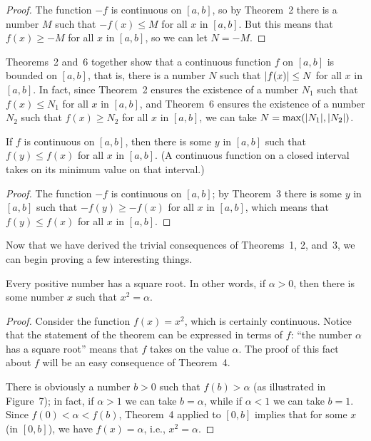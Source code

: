 \begin{proof}
The function $-f$ is continuous on $[a,b]$, so by Theorem~2 there is a number
$M$ such that $-f(x)\leq M$ for all $x$ in $[a,b]$. But this means that
$f(x)\geq -M$ for all $x$ in $[a,b]$, so we can let $N=-M$.
\end{proof}

Theorems~2 and~6 together show that a continuous function $f$ on $[a,b]$ is
bounded on $[a,b]$, that is, there is a number $N$ such that $\lvert f(x)\rvert\leq N$
for all $x$ in $[a,b]$. In fact, since Theorem~2 ensures the existence of a
number $N_1$ such that $f(x)\leq N_1$ for all $x$ in $[a,b]$, and Theorem~6
ensures the existence of a number $N_2$ such that $f(x)\geq N_2$ for all $x$ in
$[a,b]$, we can take $N=\max(\lvert N_1\rvert,\lvert N_2\rvert)$.

\begin{theorem}
If $f$ is continuous on $[a,b]$, then there is some $y$ in $[a,b]$ such that
$f(y)\leq f(x)$ for all $x$ in $[a,b]$.
(A continuous function on a closed interval takes on its minimum value on that
interval.)
\end{theorem}

\begin{proof}
The function $-f$ is continuous on $[a,b]$; by Theorem~3 there is some $y$ in
$[a,b]$ such that $-f(y)\geq -f(x)$ for all $x$ in $[a,b]$, which means that
$f(y)\leq f(x)$ for all $x$ in $[a,b]$.
\end{proof}

Now that we have derived the trivial consequences of Theorems~1, 2, and~3, we
can begin proving a few interesting things.

\begin{theorem}
Every positive number has a square root. In other words, if $\alpha>0$, then
there is some number $x$ such that $x^2=\alpha$.
\end{theorem}

\begin{proof}
Consider the function $f(x)=x^2$, which is certainly continuous. Notice that the
statement of the theorem can be expressed in terms of $f$: ``the number $\alpha$
has a square root'' means that $f$ takes on the value $\alpha$. The proof of
this fact about $f$ will be an easy consequence of Theorem~4.

There is obviously a number $b>0$ such that $f(b)>\alpha$ (as illustrated in
Figure~7); in fact, if $\alpha>1$ we can take $b=\alpha$, while if $\alpha<1$ we
can take $b=1$. Since $f(0)<\alpha<f(b)$, Theorem~4 applied to $[0,b]$ implies
that for some $x$ (in $[0,b]$), we have $f(x)=\alpha$, i.e., $x^2=\alpha$.
\end{proof}
\begin{center}
\\[0.6em]
\end{center}

